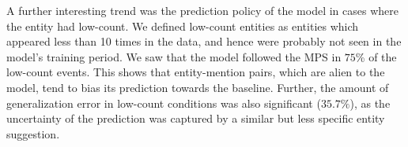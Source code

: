 \documentclass[11pt]{article}
\newcommand\toin{\todo[inline]}
\begin{document}
A further interesting trend was the prediction policy of the model in cases where the entity had low-count. We defined low-count entities as entities which appeared less than 10 times in the data, and hence were probably not seen in the model's training period. We saw that the model followed the MPS in $75$\% of the low-count events. This shows that entity-mention pairs, which are alien to the model, tend to bias its prediction towards the baseline. Further, the amount of generalization error in low-count conditions was also significant ($35.7\%$), as the uncertainty of the prediction was captured by a similar but less specific entity suggestion.





\end{document}
